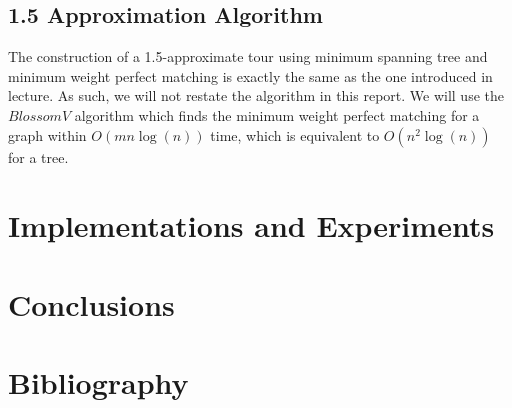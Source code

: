 \documentclass[paper=a4, fontsize=11pt]{scrartcl}	%
\numberwithin{equation}{section}		%
\numberwithin{figure}{section}			%
\numberwithin{table}{section}				%
\begin{document}
\subsection{1.5 Approximation Algorithm}
The construction of a 1.5-approximate tour using minimum spanning tree and minimum weight perfect matching is exactly the same as the one introduced in lecture. As such, we will not restate the algorithm in this report. We will use the $Blossom V$ algorithm \cite{kolmogorov} which finds the minimum weight perfect matching for a graph within $O(mn \log(n))$ time, which is equivalent to $O(n^2 \log(n))$ for a tree.

\section{Implementations and Experiments}

\section{Conclusions}

\section{Bibliography}

\nocite{*}

\end{document}
